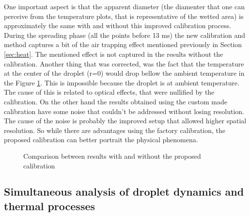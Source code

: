 \par One important aspect is that the apparent diameter (the diamenter that one can perceive from the temperature plots, that is representative of the wetted area) is approximately the same with and without this improved calibration process. During the spreading phase (all the points before 13 ms) the new calibration and method captures a bit of the air trapping effect mentioned previously in Section \ref{sec:heat}. The mentioned effect is not captured in the results without the calibration. Another thing that was corrected, was the fact that the temperature at the center of the droplet (r=0) would drop bellow the ambient temperature in the Figure \ref{fig:calibcomp2}. This is impossible because the droplet is at ambient temperature. The cause of this is related to optical effects, that were nullified by the calibration. On the other hand the results obtained using the custom made calibration have some noise that couldn't be addressed without losing resolution. The cause of the noise is probably the improved setup that allowed higher spatial resolution. So while there are advantages using the factory calibration, the proposed calibration can better portrait the physical phenomena. \\

\begin{figure}
\centering
{}
\caption{Comparison between results with and without the proposed calibration}
\label{fig:calibcomp2}
\end{figure}

\subsection{Simultaneous analysis of droplet dynamics and thermal processes}

